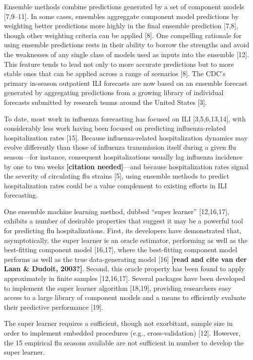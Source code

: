\documentclass[10pt,letterpaper]{article}
\begin{document}
Ensemble methods combine predictions generated by a set of component
models {[}7,9--11{]}. In some cases, ensembles aggreggate component
model predictions by weighting better predictions more highly in the
final ensemble prediction {[}7,8{]}, though other weighting criteria can
be applied {[}8{]}. One compelling rationale for using ensemble
predictions rests in their ability to borrow the strengths and avoid the
weaknesses of any single class of models used as inputs into the
ensemble {[}12{]}. This feature tends to lead not only to more accurate
predictions but to more stable ones that can be applied across a range
of scenarios {[}8{]}. The CDC's primary in-season outpatient ILI
forecasts are now based on an ensemble forecast generated by aggregating
predictions from a growing library of individual forecasts submitted by
research teams around the United States {[}3{]}.

To date, most work in influenza forecasting has focused on ILI
{[}3,5,6,13,14{]}, with considerably less work having been focused on
predicting influenza-related hospitalization rates {[}15{]}. Because
influenza-related hospitalization dynamics may evolve differently than
those of influenza transmission itself during a given flu season---for
instance, consequent hospitalizations usually lag influenza incidence by
one to two weeks \textbf{{[}citation needed{]}}---and because
hospitalization rates signal the severity of circulating flu strains
{[}5{]}, using ensemble methods to predict hospitalization rates could
be a value complement to existing efforts in ILI forecasting.

One ensemble machine learning method, dubbed ``super learner''
{[}12,16,17{]}, exhibits a number of desirable properties that suggest
it may be a powerful tool for predicting flu hospitalizations. First,
its developers have demonstrated that, asymptotically, the super learner
is an oracle estimator, performing as well as the best-fitting component
model {[}16,17{]}, where the best-fitting component model performs as
well as the true data-generating model {[}16{]} \textbf{{[}read and cite
van der Laan \& Dudoit, 2003?{]}}. Second, this oracle property has been
found to apply approximately in finite samples {[}12,16,17{]}. Several
packages have been developed to implement the super learner algorithm
{[}18,19{]}, providing researchers easy access to a large library of
component models and a means to efficiently evaluate their predictive
performance {[}19{]}.

The super learner requires a sufficient, though not exorbitant, sample
size in order to implement embedded procedures (e.g., cross-validation)
{[}12{]}. However, the 15 empirical flu seasons available are not
sufficient in number to develop the super learner.
\end{document}
